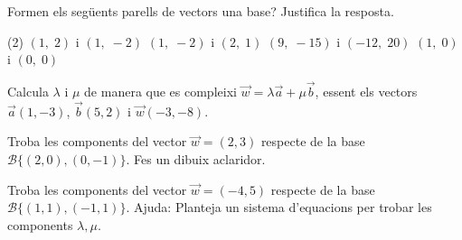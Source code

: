 \begin{mylist}
  \exer  Formen els següents parells de vectors una base? Justifica la resposta.
  \begin{tasks}(2)
  	\task
	$\left(1,\; 2\right)$ i $\left(1,\; -2\right)$   	\task $\left(1,\; -2\right)$ i $\left(2,\; 1\right)$ 	\task $\left(9,\; -15\right)$ i $\left(-12,\; 20\right)$ 	\task $\left(1,\; 0\right)$ i $\left(0,\; 0\right)$
	\end{tasks}


\exer Calcula $\lambda$ i $\mu$ de manera que es compleixi $\vec w=\lambda \vec a + \mu \vec b$, essent els vectors $\vec a(1,-3)$, $\vec b(5, 2)$ i $\vec w(-3, -8)$.


\exer Troba les components del vector $\vec w=(2, 3)$ respecte de la base $\mathcal{B}\{(2,0), (0,-1)\}$. Fes un dibuix aclaridor.


\exer Troba les components del vector $\vec w=(-4, 5)$ respecte de la base $\mathcal{B}\{(1,1), (-1,1)\}$. Ajuda: Planteja un sistema d'equacions per trobar les components $\lambda, \mu$. 


\end{mylist}

